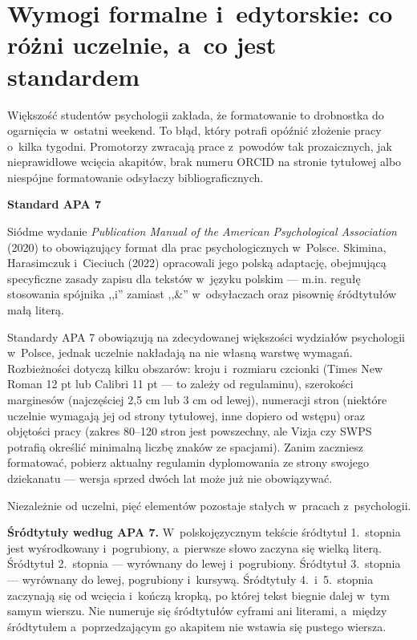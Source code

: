 \documentclass[12pt,a4paper,twoside,openany]{book}
\let\bforigsection\section
\renewcommand{\section}{\needspace{4\baselineskip}\bforigsection}
\newcommand{\concept}[2]{%
  \par\vspace{6pt}
  \begin{tcolorbox}[enhanced, breakable, colback=accent!6, colframe=accent,
    boxrule=0pt, leftrule=3.5pt, arc=2pt, drop fuzzy shadow={black!15},
    left=10pt, right=10pt, top=7pt, bottom=7pt, before upper={\parindent0pt}]
    {\sffamily\bfseries\color{accent}#1}\par\vspace{2pt}\small #2
  \end{tcolorbox}\par
}
\begin{document}
\section{Wymogi formalne i~edytorskie: co różni uczelnie, a~co jest standardem}

Większość studentów psychologii zakłada, że formatowanie to drobnostka do ogarnięcia w~ostatni weekend. To błąd, który potrafi opóźnić złożenie pracy o~kilka tygodni. Promotorzy zwracają prace z~powodów tak prozaicznych, jak nieprawidłowe wcięcia akapitów, brak numeru ORCID na stronie tytułowej albo niespójne formatowanie odsyłaczy bibliograficznych.

\concept{Standard APA 7}{Siódme wydanie \emph{Publication Manual of the American Psychological Association} (2020) to obowiązujący format dla prac psychologicznych w~Polsce. Skimina, Harasimczuk i~Cieciuch (2022) opracowali jego polską adaptację, obejmującą specyficzne zasady zapisu dla tekstów w~języku polskim --- m.in. regułę stosowania spójnika ,,i'' zamiast ,,\&'' w~odsyłaczach oraz pisownię śródtytułów małą literą.}

Standardy APA 7 obowiązują na zdecydowanej większości wydziałów psychologii w~Polsce, jednak uczelnie nakładają na nie własną warstwę wymagań. Rozbieżności dotyczą kilku obszarów: kroju i~rozmiaru czcionki (Times New Roman 12 pt lub Calibri 11 pt --- to zależy od regulaminu), szerokości marginesów (najczęściej 2,5 cm lub 3 cm od lewej), numeracji stron (niektóre uczelnie wymagają jej od strony tytułowej, inne dopiero od wstępu) oraz objętości pracy (zakres 80--120 stron jest powszechny, ale Vizja czy SWPS potrafią określić minimalną liczbę znaków ze spacjami). Zanim zaczniesz formatować, pobierz aktualny regulamin dyplomowania ze strony swojego dziekanatu --- wersja sprzed dwóch lat może już nie obowiązywać.

Niezależnie od uczelni, pięć elementów pozostaje stałych w~pracach z~psychologii.

\textbf{Śródtytuły według APA 7.} W~polskojęzycznym tekście śródtytuł 1.\ stopnia jest wyśrodkowany i~pogrubiony, a~pierwsze słowo zaczyna się wielką literą. Śródtytuł 2.\ stopnia --- wyrównany do lewej i~pogrubiony. Śródtytuł 3.\ stopnia --- wyrównany do lewej, pogrubiony i~kursywą. Śródtytuły 4.\ i~5.\ stopnia zaczynają się od wcięcia i~kończą kropką, po której tekst biegnie dalej w~tym samym wierszu. Nie numeruje się śródtytułów cyframi ani literami, a~między śródtytułem a~poprzedzającym go akapitem nie wstawia się pustego wiersza.
\end{document}
